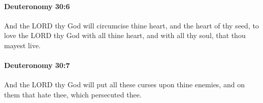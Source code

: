 		\paragraph{Deuteronomy 30:6} %
			\label{DEUTERONOMY-30-6}

			And the LORD thy God will circumcise thine heart, and the heart of thy seed, to love the LORD thy God with all thine heart, and with all thy soul, that thou mayest live.


		\paragraph{Deuteronomy 30:7} %
			\label{DEUTERONOMY-30-7}

			And the LORD thy God will put all these curses upon thine enemies, and on them that hate thee, which persecuted thee.


